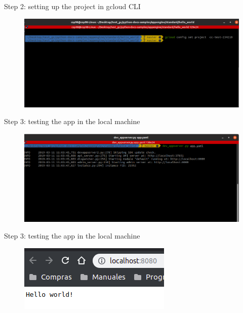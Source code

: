 \documentclass{beamer}
\begin{document}
\begin{frame}[fragile]{Step 2: setting up the project in gcloud CLI}
    \begin{figure}[H]
      \centering
      \includegraphics[scale=0.33]{img/tutorial/3setproject}
    \end{figure}
\end{frame}

\begin{frame}[fragile]{Step 3: testing the app in the local machine}
    \begin{figure}[H]
      \centering
      \includegraphics[scale=0.33]{img/tutorial/4localdeploy}
    \end{figure}
\end{frame}

\begin{frame}[fragile]{Step 3: testing the app in the local machine}
    \begin{figure}[H]
      \centering
      \includegraphics[scale=1]{img/tutorial/5localbrowse}
    \end{figure}
\end{frame}
\end{document}
